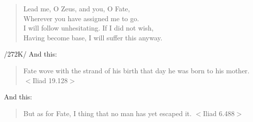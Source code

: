 \begin{verse}
Lead me, O Zeus, and you, O Fate, \\
Wherever you have assigned me to go. \\
I will follow unhesitating. If I did not wish,  \\
Having become base, I will suffer this anyway. \\
\end{verse}

/272K/ And this:
\begin{verse}
Fate wove with the strand of his birth that day he was born to his mother. $<$Iliad 19.128$>$
\end{verse}

And this:
\begin{verse}
But as for Fate, I thing that no man has yet escaped it. $<$Iliad 6.488$>$
\end{verse}

\newpage